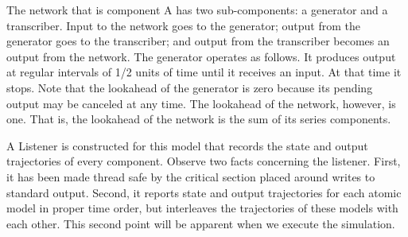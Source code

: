 The network that is component A has two sub-components: a generator and a transcriber. Input to the network goes to the generator; output from the generator goes to the transcriber; and output from the transcriber becomes an output from the network. The generator operates as follows. It produces output at regular intervals of 1/2 units of time until it receives an input. At that time it stops. Note that the lookahead of the generator is zero because its pending output may be canceled at any time. The lookahead of the network, however, is one. That is, the lookahead of the network is the sum of its series components. 

A Listener is constructed for this model that records the state and output trajectories of every component. Observe two facts concerning the listener. First, it has been made thread safe by the critical section placed around writes to standard output. Second, it reports state and output trajectories for each atomic model in proper time order, but interleaves the trajectories of these models with each other. This second point will be apparent when we execute the simulation.

